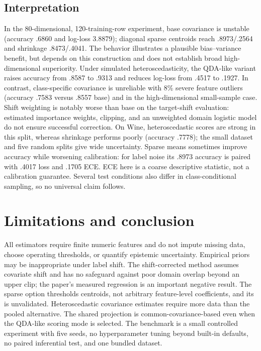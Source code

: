 \documentclass[conference]{IEEEtran}
\begin{document}
\subsection{Interpretation}
In the 80-dimensional, 120-training-row experiment, base covariance is unstable (accuracy .6860 and log-loss 3.8879); diagonal sparse centroids reach .8973/.2564 and shrinkage .8473/.4041. The behavior illustrates a plausible bias--variance benefit, but depends on this construction and does not establish broad high-dimensional superiority. Under simulated heteroscedasticity, the QDA-like variant raises accuracy from .8587 to .9313 and reduces log-loss from .4517 to .1927. In contrast, class-specific covariance is unreliable with 8\% severe feature outliers (accuracy .7583 versus .8557 base) and in the high-dimensional small-sample case. Shift weighting is notably worse than base on the target-shift evaluation: estimated importance weights, clipping, and an unweighted domain logistic model do not ensure successful correction. On Wine, heteroscedastic scores are strong in this split, whereas shrinkage performs poorly (accuracy .7778); the small dataset and five random splits give wide uncertainty. Sparse means sometimes improve accuracy while worsening calibration: for label noise its .8973 accuracy is paired with .4017 loss and .1705 ECE. ECE here is a coarse descriptive statistic, not a calibration guarantee. Several test conditions also differ in class-conditional sampling, so no universal claim follows.

\section{Limitations and conclusion}
All estimators require finite numeric features and do not impute missing data, choose operating thresholds, or quantify epistemic uncertainty. Empirical priors may be inappropriate under label shift. The shift-corrected method assumes covariate shift and has no safeguard against poor domain overlap beyond an upper clip; the paper's measured regression is an important negative result. The sparse option thresholds centroids, not arbitrary feature-level coefficients, and its  is unvalidated. Heteroscedastic covariance estimates require more data than the pooled alternative. The shared projection is common-covariance-based even when the QDA-like scoring mode is selected. The benchmark is a small controlled experiment with five seeds, no hyperparameter tuning beyond built-in defaults, no paired inferential test, and one bundled dataset.
\end{document}
